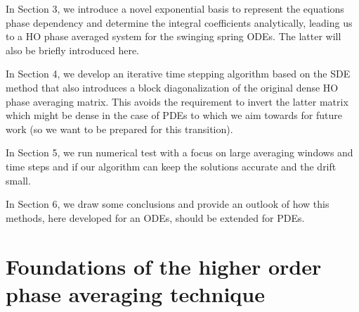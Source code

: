 \documentclass[a4,12pt]{article}
\begin{document}
\begin{itemize}
 In Section 3, we introduce a novel exponential basis to represent the equations phase dependency and determine the integral coefficients analytically, leading us to a HO phase averaged system for the swinging spring ODEs. The latter will also be briefly introduced here.

 In Section 4, we develop an iterative time stepping algorithm based on the SDE method that also introduces a block diagonalization of the original dense HO phase averaging matrix. This avoids the requirement to invert the latter matrix which might be dense in the case of PDEs to which we aim towards for future work (so we want to be prepared for this transition).

 In Section 5, we run numerical test with a focus on large averaging windows and time steps and if our algorithm can keep the solutions accurate and the drift small.

 In Section 6, we draw some conclusions and provide an outlook of how this methods, here developed for an ODEs, should be extended for PDEs.



\end{itemize}


\section{Foundations of the higher order phase averaging technique}
\end{document}
